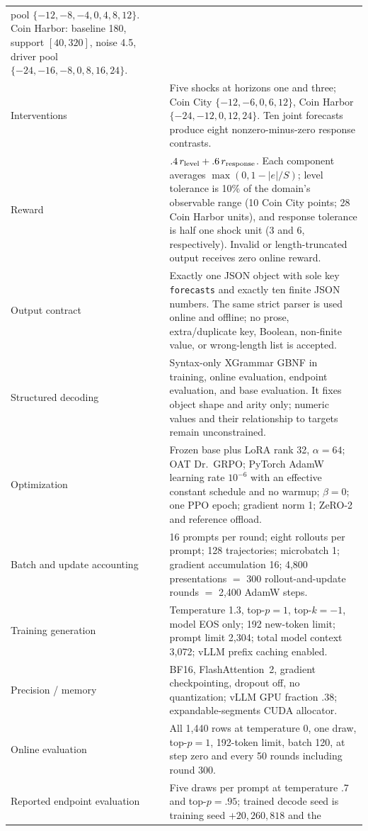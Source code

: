 \begin{center}
\begin{minipage}{\linewidth}
\begin{tabular}{p{.29\linewidth}p{.66\linewidth}}
pool $\{-12,-8,-4,0,4,8,12\}$. Coin Harbor: baseline 180, support $[40,320]$,
noise 4.5, driver pool $\{-24,-16,-8,0,8,16,24\}$. \\
Interventions & Five shocks at horizons one and three; Coin City
$\{-12,-6,0,6,12\}$, Coin Harbor $\{-24,-12,0,12,24\}$. Ten joint forecasts
produce eight nonzero-minus-zero response contrasts. \\
Reward & $.4\,r_{\rm level}+.6\,r_{\rm response}$. Each component averages
$\max(0,1-|e|/S)$; level tolerance is 10\% of the domain's observable range
(10 Coin City points; 28 Coin Harbor units), and response tolerance is half one
shock unit (3 and 6, respectively). Invalid or length-truncated output receives
zero online reward. \\
Output contract & Exactly one JSON object with sole key
\texttt{forecasts} and exactly ten finite JSON numbers. The same strict parser
is used online and offline; no prose, extra/duplicate key, Boolean, non-finite
value, or wrong-length list is accepted. \\
Structured decoding & Syntax-only XGrammar GBNF in training, online evaluation,
endpoint evaluation, and base evaluation. It fixes object shape and arity only;
numeric values and their relationship to targets remain unconstrained. \\
Optimization & Frozen base plus LoRA rank 32, $\alpha=64$; OAT Dr.~GRPO;
PyTorch AdamW learning rate $10^{-6}$ with an effective constant schedule and no
warmup; $\beta=0$; one PPO epoch; gradient norm 1; ZeRO-2 and reference offload. \\
Batch and update accounting & 16 prompts per round; eight rollouts per prompt;
128 trajectories; microbatch 1; gradient accumulation 16; 4,800 presentations
$=$ 300 rollout-and-update rounds $=$ 2,400 AdamW steps. \\
Training generation & Temperature 1.3, top-$p=1$, top-$k=-1$, model EOS only;
192 new-token limit; prompt limit 2,304; total model context 3,072; vLLM prefix
caching enabled. \\
Precision / memory & BF16, FlashAttention~2, gradient checkpointing, dropout
off, no quantization; vLLM GPU fraction .38; expandable-segments CUDA allocator. \\
Online evaluation & All 1,440 rows at temperature 0, one draw, top-$p=1$,
192-token limit, batch 120, at step zero and every 50 rounds including round 300. \\
Reported endpoint evaluation & Five draws per prompt at temperature .7 and
top-$p=.95$; trained decode seed is training seed $+20{,}260{,}818$ and the

\end{tabular}
\end{minipage}
\end{center}

